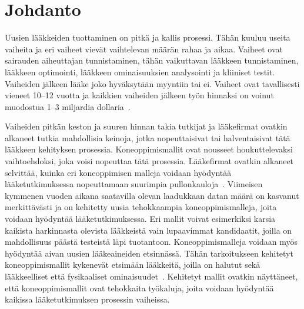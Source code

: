 \documentclass[finnish,twoside,censored,tkt,sw-line]{HYthesisML}
\begin{document}
\newpage
\mytableofcontents{}
\mainmatter{}


%
%
%
% 


\chapter{Johdanto}

Uusien lääkkeiden tuottaminen on pitkä ja kallis prosessi.
Tähän kuuluu useita vaiheita ja eri vaiheet vievät vaihtelevan määrän rahaa ja aikaa.
Vaiheet ovat sairauden aiheuttajan tunnistaminen, tähän vaikuttavan lääkkeen tunnistaminen, lääkkeen optimointi, lääkkeen ominaisuuksien analysointi ja kliiniset testit.
Vaiheiden jälkeen lääke joko hyväksytään myyntiin tai ei.
Vaiheet ovat tavallisesti vieneet 10--12 vuotta ja kaikkien vaiheiden jälkeen työn hinnaksi on voinut muodostua 1--3 miljardia dollaria~\cite{EkinsSean2019Emlf}.

Vaiheiden pitkän keston ja suuren hinnan takia tutkijat ja lääkefirmat ovatkin alkaneet tutkia mahdollisia keinoja, jotka nopeuttaisivat tai halventaisivat tätä lääkkeen kehityksen prosessia.
Koneoppimismallit ovat nousseet houkuttelevaksi vaihtoehdoksi, joka voisi nopeuttaa tätä prosessia.
Lääkefirmat ovatkin alkaneet selvittää, kuinka eri koneoppimisen malleja voidaan hyödyntää lääketutkimuksessa nopeuttamaan suurimpia pullonkauloja~\cite{EkinsSean2019Emlf}.
Viimeisen kymmenen vuoden aikana saatavilla olevan laadukkaan datan määrä on kasvanut merkittävästi ja on kehitetty uusia tehokkaampia koneoppimismalleja, joita voidaan hyödyntää lääketutkimuksessa.
Eri mallit voivat esimerkiksi karsia kaikista harkinnasta olevista lääkkeistä vain lupaavimmat kandidaatit, joilla on mahdollisuus päästä testeistä läpi tuotantoon.
Koneoppimismalleja voidaan myös hyödyntää aivan uusien lääkeaineiden etsinnässä.
Tähän tarkoitukseen kehitetyt koneoppimismallit kykenevät etsimään lääkkeitä, joilla on halutut sekä lääkkeelliset että fysikaaliset ominaisuudet~\cite{VamathevanJessica2019Aoml}.
Kehitetyt mallit ovatkin näyttäneet, että koneoppimismallit ovat tehokkaita työkaluja, joita voidaan hyödyntää kaikissa lääketutkimuksen prosessin vaiheissa.
\end{document}
